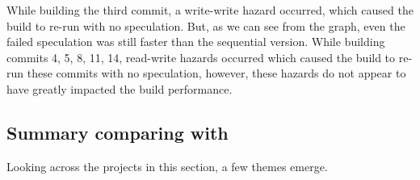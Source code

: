 While building the third commit, a write-write hazard occurred, which caused the build to re-run
with no speculation.  But, as we can see from the graph, even the failed speculation was still faster than the sequential
version.  While building commits 4, 5, 8, 11, 14, read-write hazards occurred which caused the
build to re-run these commits with no speculation, however, these hazards do not appear to have greatly impacted the build performance.








\subsection{Summary comparing with \Make}

Looking across the projects in this section, a few themes emerge.

